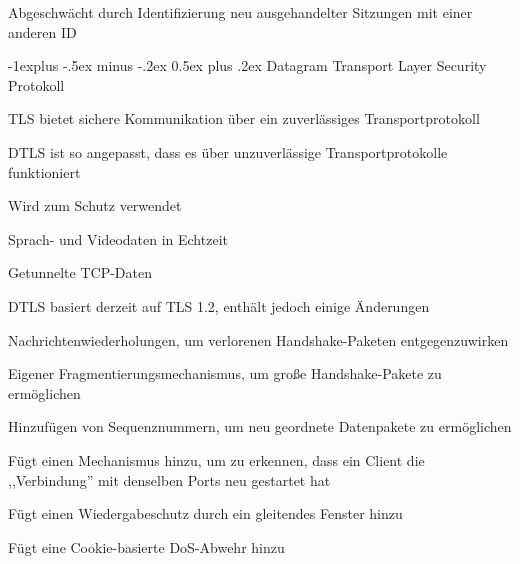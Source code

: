 \documentclass[a4paper]{article}
\makeatletter
\renewcommand{\subsection}{\@startsection{subsection}{2}{0mm}%
 {-1explus -.5ex minus -.2ex}%
 {0.5ex plus .2ex}%
 {\normalfont\normalsize\bfseries}}
\makeatother
\begin{document}
\begin{multicols}{3}
\begin{itemize*}
\begin{itemize*}
                  \item Abgeschwächt durch Identifizierung neu ausgehandelter Sitzungen mit einer anderen ID
            \end{itemize*}
      \end{itemize*}

      \subsection{Datagram Transport Layer Security Protokoll}
      \begin{itemize*}
            \item TLS bietet sichere Kommunikation über ein zuverlässiges Transportprotokoll
            \item DTLS ist so angepasst, dass es über unzuverlässige Transportprotokolle funktioniert
            \item Wird zum Schutz verwendet
            \begin{itemize*}
                  \item Sprach- und Videodaten in Echtzeit%
                  \item Getunnelte TCP-Daten
            \end{itemize*}
            \item DTLS basiert derzeit auf TLS 1.2, enthält jedoch einige Änderungen
            \begin{itemize*}
                  \item Nachrichtenwiederholungen, um verlorenen Handshake-Paketen entgegenzuwirken
                  \item Eigener Fragmentierungsmechanismus, um große Handshake-Pakete zu ermöglichen
                  \item Hinzufügen von Sequenznummern, um neu geordnete Datenpakete zu ermöglichen %
                  \item Fügt einen Mechanismus hinzu, um zu erkennen, dass ein Client die ,,Verbindung'' mit denselben Ports neu gestartet hat %
                  \item Fügt einen Wiedergabeschutz durch ein gleitendes Fenster hinzu %
                  \item Fügt eine Cookie-basierte DoS-Abwehr hinzu %
            \end{itemize*}
      \end{itemize*}


\end{multicols}
\end{document}
